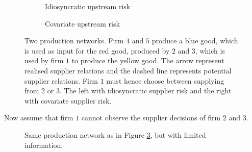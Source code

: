 \documentclass[../main.tex]{subfiles}
\begin{document}
\begin{figure}[h]
  \centering
  \begin{subfigure}{.5\textwidth}
    \centering
    \caption{Idiosyncratic upstream risk}
    \label{fig:example:idio}  
  \end{subfigure}%
  \begin{subfigure}{.5\textwidth}
    \centering
    \caption{Covariate upstream risk}
    \label{fig:example:cov}
  \end{subfigure}
  \caption{Two production networks. Firm $4$ and $5$ produce a blue good, which is used as input for the red good, produced by $2$ and $3$, which is used by firm $1$ to produce the yellow good. The arrow represent realised supplier relations and the dashed line represents potential supplier relations. Firm $1$ must hence choose between supplying from $2$ or $3$. The left with idiosyncratic supplier risk and the right with covariate supplier risk.}
  \label{fig:example}
\end{figure}

Now assume that firm $1$ cannot observe the supplier decisions of firm $2$ and $3$. 

\begin{figure}[h]
  \centering
  \caption{Same production network as in Figure \ref{fig:example}, but with limited information.}
  \label{fig:example:unknown}  
\end{figure}
\end{document}
